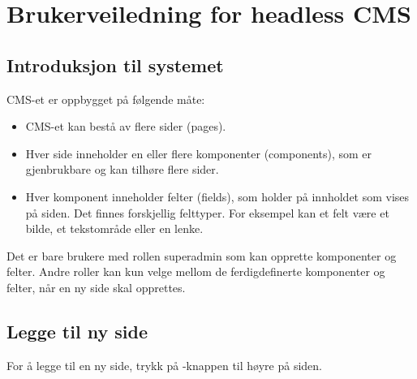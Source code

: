 \chapter{Brukerveiledning for headless CMS}
\label{appendix:user-manual}

\section{Introduksjon til systemet}
CMS-et er oppbygget på følgende måte: 

\begin{itemize}
\item CMS-et kan bestå av flere sider (pages).
\item Hver side inneholder en eller flere komponenter (components), som er gjenbrukbare og kan tilhøre flere sider.
\item Hver komponent inneholder felter (fields), som holder på innholdet som vises på siden. Det finnes forskjellig felttyper. For eksempel kan et felt være et bilde, et tekstområde eller en lenke. 
\end{itemize}

Det er bare brukere med rollen superadmin som kan opprette komponenter og felter. Andre roller kan kun velge mellom de ferdigdefinerte komponenter og felter, når en ny side skal opprettes.

\section{Legge til ny side}

For å legge til en ny side, trykk på -knappen til høyre på siden. 

\begin{figure}[H]
    \centering
    \label{fig:cms-new-page}
\end{figure}

